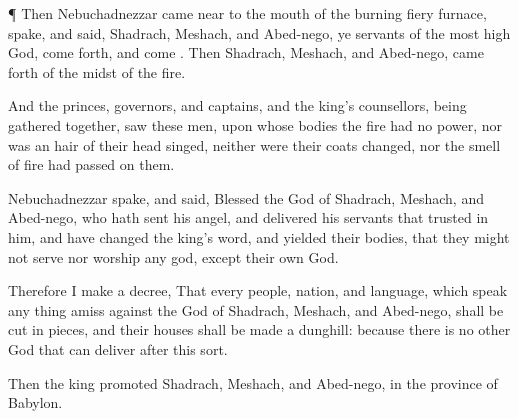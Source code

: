 {\par }{\PP {}¶
Then
Nebuchadnezzar came
near to the
mouth of the
burning
fiery
furnace,
{}
spake, and
said,
Shadrach,
Meshach, and
Abed-nego, ye
servants of the most
high
God, come
forth, and
come
{}.
Then
Shadrach,
Meshach, and
Abed-nego, came
forth
of the
midst of the
fire.

And the
princes,
governors, and
captains, and the
king’s
counsellors, being gathered
together,
saw
these
men, upon whose
bodies the
fire had
no
power,
nor was an
hair of their
head
singed,
neither were their
coats
changed,
nor the
smell of
fire had
passed on them.


\par }{\PP {}
Nebuchadnezzar
spake, and
said,
Blessed
{} the
God of
Shadrach,
Meshach, and
Abed-nego, who hath
sent his
angel, and
delivered his
servants that
trusted in
him, and have
changed the
king’s
word, and
yielded their
bodies, that they might
not
serve
nor
worship
any
god,
except their own
God.

Therefore
I
make a
decree, That
every
people,
nation, and
language, which
speak any thing
amiss
against the
God of
Shadrach,
Meshach, and
Abed-nego, shall be
cut in
pieces, and their
houses shall be
made a
dunghill:
because there
is
no
other
God that
can
deliver after
this sort.

Then the
king
promoted
Shadrach,
Meshach, and
Abed-nego, in the
province of
Babylon.




\par }
